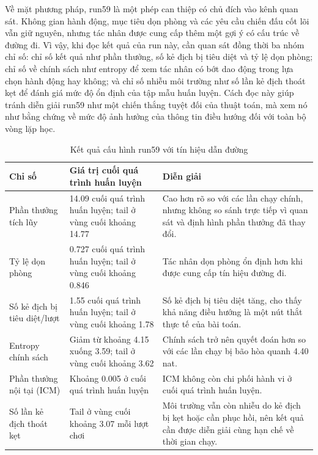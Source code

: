 Về mặt phương pháp, run59 là một phép can thiệp có chủ đích vào kênh quan sát. Không gian hành động, mục tiêu dọn phòng và các yêu cầu chiến đấu cốt lõi vẫn giữ nguyên, nhưng tác nhân được cung cấp thêm một gợi ý có cấu trúc về đường đi. Vì vậy, khi đọc kết quả của run này, cần quan sát đồng thời ba nhóm chỉ số: chỉ số kết quả như phần thưởng, số kẻ địch bị tiêu diệt và tỷ lệ dọn phòng; chỉ số về chính sách như entropy để xem tác nhân có bớt dao động trong lựa chọn hành động hay không; và chỉ số nhiễu môi trường như số lần kẻ địch thoát kẹt để đánh giá mức độ ổn định của tập mẫu huấn luyện. Cách đọc này giúp tránh diễn giải run59 như một chiến thắng tuyệt đối của thuật toán, mà xem nó như bằng chứng về mức độ ảnh hưởng của thông tin điều hướng đối với toàn bộ vòng lặp học.

\begin{table}[H]
    \centering
    \small
    \caption{Kết quả cấu hình run59 với tín hiệu dẫn đường}
    \label{tab:run59_bfs_assisted}
    \begin{tabular}{|p{4.1cm}|p{3.7cm}|p{6.4cm}|}
        \hline
        \textbf{Chỉ số} & \textbf{Giá trị cuối quá trình huấn luyện} & \textbf{Diễn giải} \\
        \hline
        Phần thưởng tích lũy & 14.09 cuối quá trình huấn luyện; tail ở vùng cuối khoảng 14.77 & Cao hơn rõ so với các lần chạy chính, nhưng không so sánh trực tiếp vì quan sát và định hình phần thưởng đã thay đổi. \\
        \hline
        Tỷ lệ dọn phòng & 0.727 cuối quá trình huấn luyện; tail ở vùng cuối khoảng 0.846 & Tác nhân dọn phòng ổn định hơn khi được cung cấp tín hiệu đường đi. \\
        \hline
        Số kẻ địch bị tiêu diệt/lượt & 1.55 cuối quá trình huấn luyện; tail ở vùng cuối khoảng 1.78 & Số kẻ địch bị tiêu diệt tăng, cho thấy khả năng điều hướng là một nút thắt thực tế của bài toán. \\
        \hline
        Entropy chính sách & Giảm từ khoảng 4.15 xuống 3.59; tail ở vùng cuối khoảng 3.62 & Chính sách trở nên quyết đoán hơn so với các lần chạy bị bão hòa quanh 4.40 nat. \\
        \hline
        Phần thưởng nội tại (ICM) & Khoảng 0.005 ở cuối quá trình huấn luyện & ICM không còn chi phối hành vi ở cuối quá trình huấn luyện. \\
        \hline
        Số lần kẻ địch thoát kẹt & Tail ở vùng cuối khoảng 3.07 mỗi lượt chơi & Môi trường vẫn còn nhiễu do kẻ địch bị kẹt hoặc cần phục hồi, nên kết quả cần được diễn giải cùng hạn chế về thời gian chạy. \\
        \hline
    \end{tabular}
\end{table}

